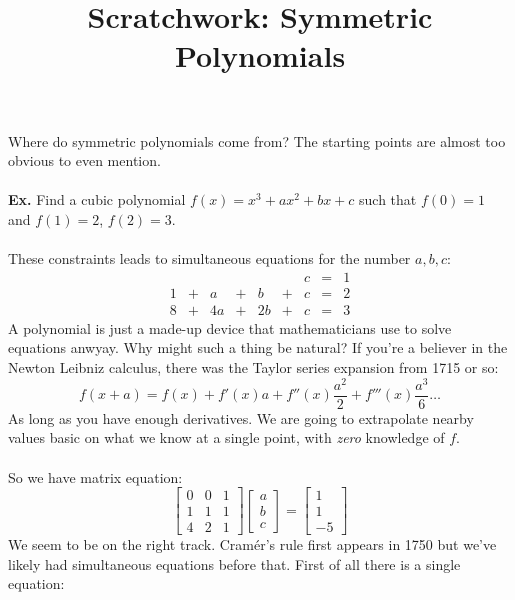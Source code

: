 \documentclass[12pt]{article}
\title{Scratchwork: Symmetric Polynomials}
\date{}
\begin{document}

\sffamily

\maketitle

\noindent Where do symmetric polynomials come from?  The starting points are almost too obvious to even mention. \\ \\
\textbf{Ex.} Find a cubic polynomial $f(x) = x^3 + ax^2 + bx + c$ such that $f(0)=1$ and $f(1) = 2$, $f(2) = 3$. \\ \\
These constraints leads to simultaneous equations for the number $a,b,c$:
$$\begin{array}{rcrcrcrcc}
    &   &    &   &    &  & c &=& 1 \\
 1  & + &  a & + & b  &+ & c &=& 2 \\
 8  & + & 4a & + & 2b &+ & c &=& 3 
\end{array}$$
A polynomial is just a made-up device that mathematicians use to solve equations anwyay.  Why might such a thing be natural?  If you're a believer in the Newton Leibniz calculus, there was the Taylor series expansion from 1715 or so:
$$ f(x+a) = f(x) + f'(x) a + f''(x) \frac{a^2}{2} + f'''(x) \frac{a^3}{6}\dots $$
As long as you have enough derivatives.  We are going to extrapolate nearby values basic on what we know at a single point, with \textit{zero} knowledge of $f$. \\ \\
So we have matrix equation:
$$
\left[ 
\begin{array}{rrr}  0 & 0 & 1 \\
 1 & 1 & 1 \\
 4 & 2 & 1 \end{array}\right]
\left[ 
\begin{array}{r} a \\
b  \\
c  \end{array}\right] = 
\left[ 
\begin{array}{r} 1 \\
1  \\
-5 \end{array}\right] 
 $$
We seem to be on the right track.  Cram\'{e}r's rule first appears in 1750 but we've likely had simultaneous equations before that.  First of all there is a single equation:
\end{document}

